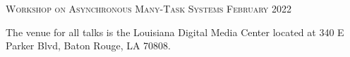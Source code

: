 \documentclass[11pt,letterpaper]{article} %
\begin{document}
\pagestyle{empty} %

\setlength{\parindent}{0pt} %



\begin{center}
	\textsc{\LARGE Workshop on Asynchronous Many-Task Systems}
	\textsc{\large February 2022} %
\end{center}




\begin{center}
The venue for all talks is the Louisiana Digital Media Center located at 340 E Parker Blvd, Baton Rouge, LA 70808.
\end{center}
\end{document}
